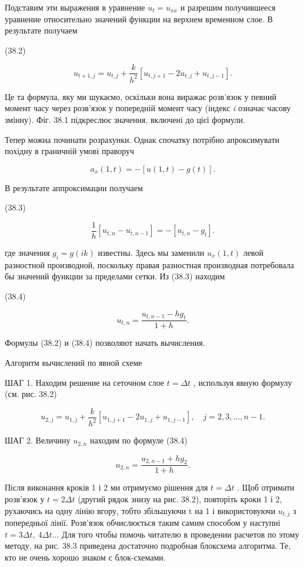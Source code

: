 \documentclass[
  ukrainian,
]{article}
\begin{document}
Подставим эти выражения в уравнение \(u_t = u_{xx}\) и разрешим
получившееся уравнение относительно значений функции на верхнем
временном слое. В результате получаем

(38.2)

\[
u_{t+1,j} = u_{t,j} + \frac{k}{h^2} \left[ u_{t,j+1} - 2u_{t,j} + u_{t,j-1} \right].
\]

Це та формула, яку ми шукаємо, оскільки вона виражає розв'язок у певний
момент часу через розв'язок у попередній момент часу (індекс \emph{i}
означає часову змінну). Фіг. 38.1 підкреслює значення, включені до цієї
формули.

Тепер можна починати розрахунки. Однак спочатку потрібно апроксимувати
похідну в граничній умові праворуч

\[
a_x(1, t) = -[u(1, t) - g(t)].
\]

В результате аппроксимации получаем

(38.3)

\[
\frac{1}{h}[u_{t,n} - u_{t,n-1}] = -[u_{t,n} - g_t].
\]

где значения \(g_i = g(ik)\) известны. Здесь мы заменили \(u_x(1, t)\)
левой разностной производной, поскольку правая разностная производная
потребовала бы значений функции за пределами сетки. Из (38.3) находим

(38.4)

\[
u_{t,n} = \frac{u_{t,n-1} - hg_t}{1 + h}.
\]

Формулы (38.2) и (38.4) позволяют начать вычисления.

Алгоритм вычислений по явной схеме

ШАГ 1. Находим решение на сеточном слое \(t = \Delta t\) , используя
явную формулу (см. рис. 38.2)

\[
u_{2,j} = u_{1,j} + \frac{k}{h^2} [u_{1,j+1} - 2u_{1,j} + u_{1,j-1}], \quad j = 2, 3, \ldots, n-1.
\]

ШАГ 2. Величину \(u_{2,n}\) находим по формуле (38.4)

\[
u_{2,n} = \frac{u_{2,n-1} + hg_2}{1+h}.
\]

Після виконання кроків 1 і 2 ми отримуємо рішення для \(t=\Delta t\) .
Щоб отримати розв'язок у \(t=2\Delta t\) (другий рядок знизу на рис.
38.2), повторіть кроки 1 і 2, рухаючись на одну лінію вгору, тобто
збільшуючи t на 1 і використовуючи \(u_{t,j}\) з попередньої лінії.
Розв'язок обчислюється таким самим способом у наступні
\(t=3\Delta t,\ 4\Delta t\dots\) Для того чтобы помочь читателю в
проведении расчетов по этому методу, на рис. 38.3 приведена достаточно
подробная блоксхема алгоритма. Те, кто не очень хорошо знаком с
блок-схемами.
\end{document}
